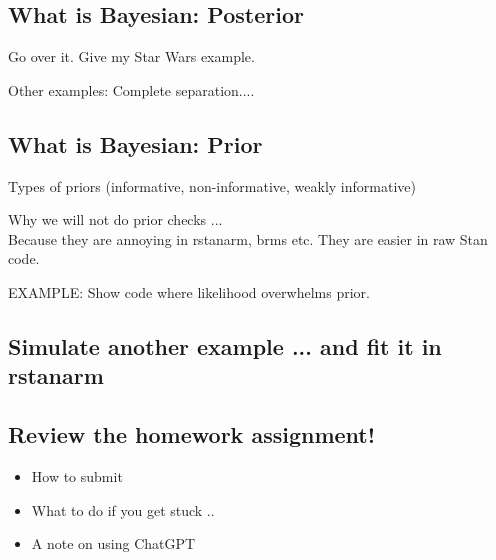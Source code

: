 \documentclass[11pt]{article}
\begin{document}
\subsection{What is Bayesian: Posterior}
Go over it.
Give my Star Wars example.

Other examples: Complete separation.... 

\subsection{What is Bayesian: Prior}

Types of priors (informative, non-informative, weakly informative)

Why we will not do prior checks ... \\ Because they are annoying in rstanarm, brms etc. They are easier in raw Stan code. 

EXAMPLE: Show code where likelihood overwhelms prior. 

\subsection{Simulate another example ... and fit it in rstanarm}


\subsection{Review the homework assignment!}
\begin{itemize}
\item How to submit
\item What to do if you get stuck ..
\item A note on using ChatGPT
\end{itemize}
\end{document}
